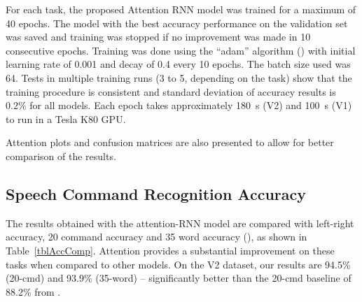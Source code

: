 \documentclass[authoryear, review, 12pt, 3p]{elsarticle}
\begin{document}
For each task, the proposed Attention RNN model was trained for a maximum of 40 epochs. The model with the best accuracy performance on the validation set was saved and training was stopped if no improvement was made in 10 consecutive epochs. Training was done using the ``adam'' algorithm (\cite{DBLP:journals/corr/KingmaB14}) with initial learning rate of 0.001 and decay of 0.4 every 10 epochs. The batch size used was 64. Tests in multiple training runs (3 to 5, depending on the task) show that the training procedure is consistent and standard deviation of accuracy results is $0.2\%$ for all models. Each epoch takes approximately 180~s (V2) and 100~s (V1) to run in a Tesla K80 GPU.

Attention plots and confusion matrices are also presented to allow for better comparison of the results.

\subsection{Speech Command Recognition Accuracy}
\label{secSpeechCmdRecog}

The results obtained with the attention-RNN model are compared with left-right accuracy, 20 command accuracy and 35 word accuracy (\cite{DBLP:journals/corr/abs-1710-08377}), as shown in Table~\ref{tblAccComp}. Attention provides a substantial improvement on these tasks when compared to other models. On the V2 dataset, our results are 94.5\% (20-cmd) and 93.9\% (35-word) -- significantly better than the 20-cmd baseline of 88.2\% from \cite{DBLP:journals/corr/abs-1804-03209}.
\end{document}
